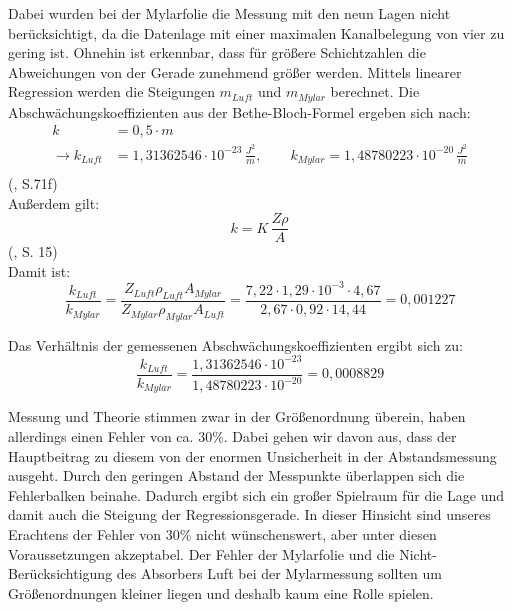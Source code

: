 \clearpage

Dabei wurden bei der Mylarfolie die Messung mit den neun Lagen nicht berücksichtigt, da die Datenlage mit einer maximalen Kanalbelegung 
von vier zu gering ist. Ohnehin ist erkennbar, dass für größere Schichtzahlen die Abweichungen von der Gerade zunehmend größer werden. 
Mittels linearer Regression werden die Steigungen $m_{Luft}$ und $m_{Mylar}$ berechnet. Die Abschwächungskoeffizienten aus der 
Bethe-Bloch-Formel ergeben sich nach: \\

\begin{align}
    k &= 0,5 \cdot m \nonumber \\
    \to k_{Luft} &= 1,31362546 \cdot 10^{-23} \, \frac{J^2}{m}, \qquad k_{Mylar} = 1,48780223 \cdot 10^{-20} \, \frac{J^2}{m} \\
\end{align}
(\cite{Jaekel1997}, S.71f) \\

Außerdem gilt: \\

\begin{equation}
    k = K \, \frac{Z \rho}{A}
\end{equation}
(\cite{Kador2021}, S. 15) \\

Damit ist: \\

\begin{equation}
    \frac{k_{Luft}}{k_{Mylar}} = \frac{Z_{Luft} \rho_{Luft} A_{Mylar}}{Z_{Mylar} \rho_{Mylar} A_{Luft}} = 
    \frac{7,22 \cdot 1,29 \cdot 10^{-3} \cdot 4,67}{2,67 \cdot 0,92 \cdot 14,44} = 0,001227
\end{equation}
 
Das Verhältnis der gemessenen Abschwächungskoeffizienten ergibt sich zu:\\

\begin{equation}
    \frac{k_{Luft}}{k_{Mylar}} = \frac{1,31362546 \cdot 10^{-23}}{1,48780223 \cdot 10^{-20}} = 0,0008829
\end{equation}

Messung und Theorie stimmen zwar in der Größenordnung überein, haben allerdings einen Fehler von ca. 30\%. Dabei gehen wir davon aus, 
dass der Hauptbeitrag zu diesem von der enormen Unsicherheit in der Abstandsmessung ausgeht. Durch den geringen Abstand der Messpunkte 
überlappen sich die Fehlerbalken beinahe. Dadurch ergibt sich ein großer Spielraum für die Lage und damit auch die Steigung der 
Regressionsgerade. In dieser Hinsicht sind unseres Erachtens der Fehler von 30\% nicht wünschenswert, aber unter diesen Voraussetzungen 
akzeptabel. Der Fehler der Mylarfolie und die Nicht-Berücksichtigung des Absorbers Luft bei der Mylarmessung 
sollten um Größenordnungen kleiner liegen und deshalb kaum eine Rolle spielen.






